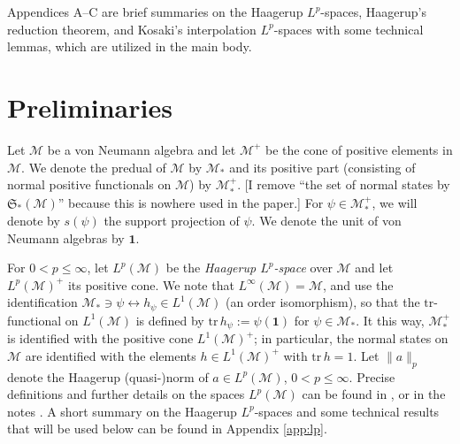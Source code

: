 \documentclass[12pt]{article}
\theoremstyle{definition}
\theoremstyle{remark}
\numberwithin{equation}{section}
\def\Me{\mathcal M}
\def\Tr{\mathrm{tr}}
\def\states {\mathfrak S}
\def\1{\mathbf{1}}
\begin{document}
{Appendices A--C are brief summaries on the Haagerup $L^p$-spaces, Haagerup's reduction theorem,
and Kosaki's interpolation $L^p$-spaces with some technical lemmas, which are utilized in the main body.}


\section{Preliminaries}



Let $\Me$ be a von Neumann algebra and let $\Me^+$ be the cone of positive elements in $\Me$. We
denote the predual of $\Me$ by $\Me_*$ {\color{blue}and its positive part (consisting of normal positive
functionals on $\Me$) by $\Me_*^+$. [I remove ``the set of normal states by $\states_*(\Me)$''
because this is nowhere used in the paper.]} For $\psi\in \Me_*^+$, we will denote by $s(\psi)$ the support
projection  of $\psi$. We denote the unit of von Neumann algebras by $\1$.

For $0< p\le \infty$, let $L^p(\Me)$ be the \emph{Haagerup $L^p$-space}
\cite{haagerup1979lpspaces,terp1981lpspaces} over $\Me$ and let $L^p(\Me)^+$ its positive cone. We
{note that $L^\infty(\Me)=\Me$, and use the identification
$\Me_*\ni \psi \leftrightarrow h_\psi\in L^1(\Me)$ (an order isomorphism)},
so that the $\Tr$-functional on $L^1(\Me)$ is defined by $\Tr\,h_\psi:=\psi(\1)$ for $\psi\in \Me_*$. It this way,
$\Me_*^+$ is identified with the positive cone $L^1(\Me)^+$; {\color{blue}in particular, the normal states
on $\Me$ are identified with the elements} $h\in L^1(\Me)^+$ with $\Tr\,h=1$. Let $\|a\|_p$ denote the
Haagerup (quasi-)norm of $a\in L^p(\Me)$, $0<p\le\infty$. Precise definitions and further details on
the spaces $L^p(\Me)$ can be found in \cite[Chap.~9]{hiai2021lectures}, or in the notes
\cite{terp1981lpspaces}. A short summary on the Haagerup $L^p$-spaces and some technical results
that will be used below can be found in Appendix \ref{app:lp}.

\end{document}
